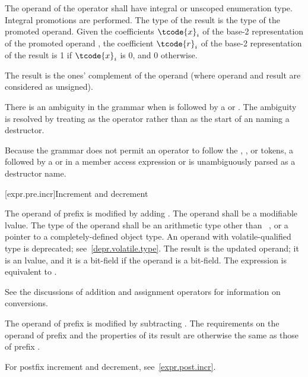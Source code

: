 \pnum
{}%
The operand of the \tcode{\~{}} operator shall have integral or unscoped enumeration type.
Integral promotions are performed.
The type of the result is the type of the promoted operand.
Given the coefficients $\tcode{x}_i$
of the base-2 representation
of the promoted operand ,
the coefficient $\tcode{r}_i$
of the base-2 representation of the result 
is 1 if $\tcode{x}_i$ is 0, and 0 otherwise.
\begin{note}
The result is the ones' complement of the operand
(where operand and result are considered as unsigned).
\end{note}
There is an ambiguity
in the grammar when \tcode{\~{}} is followed by
a  or .
The ambiguity is resolved by treating \tcode{\~{}} as the
operator rather than as the start of an 
naming a destructor.
\begin{note}
Because the grammar does not permit an operator to follow the
, \tcode{->}, or \tcode{::} tokens, a \tcode{\~{}} followed by
a  or  in a
member access expression or  is
unambiguously parsed as a destructor name.
\end{note}

[expr.pre.incr]{Increment and decrement}

\pnum
{}%
%
The operand of prefix \tcode{++}
%
%
is modified by adding .
%
The operand shall be a modifiable lvalue. The type of the operand shall
be an arithmetic type other than \cv{}~,
or a pointer to a completely-defined object type.
An operand with volatile-qualified type is deprecated;
see~\ref{depr.volatile.type}.
The result is the updated operand; it is an lvalue, and it is a
bit-field if the operand is a bit-field.
The expression  is equivalent to .
%
\begin{note}
See the discussions of addition and assignment
operators for information on conversions.
\end{note}

\pnum
The operand of prefix
%
\tcode{--} is modified by subtracting .
The requirements on the operand of prefix
\tcode{--} and the properties of its result are otherwise the same as
those of prefix \tcode{++}.
\begin{note}
For postfix increment and decrement, see~\ref{expr.post.incr}.
\end{note}

